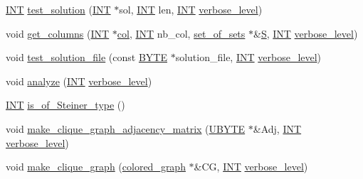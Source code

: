 \begin{DoxyCompactItemize}
\item 
\mbox{\hyperlink{galois_8h_a09fddde158a3a20bd2dcadb609de11dc}{I\+NT}} \mbox{\hyperlink{classdiophant_a385461230652130d1e4587cd99211462}{test\+\_\+solution}} (\mbox{\hyperlink{galois_8h_a09fddde158a3a20bd2dcadb609de11dc}{I\+NT}} $\ast$sol, \mbox{\hyperlink{galois_8h_a09fddde158a3a20bd2dcadb609de11dc}{I\+NT}} len, \mbox{\hyperlink{galois_8h_a09fddde158a3a20bd2dcadb609de11dc}{I\+NT}} \mbox{\hyperlink{simeon_8_c_a818073fbcc2f439e7c56952f67386122}{verbose\+\_\+level}})
\item 
void \mbox{\hyperlink{classdiophant_a394c08d30cf6df92f3d79ef52d0cff08}{get\+\_\+columns}} (\mbox{\hyperlink{galois_8h_a09fddde158a3a20bd2dcadb609de11dc}{I\+NT}} $\ast$\mbox{\hyperlink{k__arc__lifting_8_c_a567706515ba719f4d268271745d197e3}{col}}, \mbox{\hyperlink{galois_8h_a09fddde158a3a20bd2dcadb609de11dc}{I\+NT}} nb\+\_\+col, \mbox{\hyperlink{classset__of__sets}{set\+\_\+of\+\_\+sets}} $\ast$\&\mbox{\hyperlink{simeon_8_c_adab47f8243f1b5a2c31df2535d6b37d0}{S}}, \mbox{\hyperlink{galois_8h_a09fddde158a3a20bd2dcadb609de11dc}{I\+NT}} \mbox{\hyperlink{simeon_8_c_a818073fbcc2f439e7c56952f67386122}{verbose\+\_\+level}})
\item 
void \mbox{\hyperlink{classdiophant_ad5b890dbe56e93b6e7f2759d7d8ba35f}{test\+\_\+solution\+\_\+file}} (const \mbox{\hyperlink{galois_8h_ab6cc7b4aeb6ea31aba2b3fbfc83ff5e6}{B\+Y\+TE}} $\ast$solution\+\_\+file, \mbox{\hyperlink{galois_8h_a09fddde158a3a20bd2dcadb609de11dc}{I\+NT}} \mbox{\hyperlink{simeon_8_c_a818073fbcc2f439e7c56952f67386122}{verbose\+\_\+level}})
\item 
void \mbox{\hyperlink{classdiophant_a6548badaecf72d3ecb9989e9a3e518f0}{analyze}} (\mbox{\hyperlink{galois_8h_a09fddde158a3a20bd2dcadb609de11dc}{I\+NT}} \mbox{\hyperlink{simeon_8_c_a818073fbcc2f439e7c56952f67386122}{verbose\+\_\+level}})
\item 
\mbox{\hyperlink{galois_8h_a09fddde158a3a20bd2dcadb609de11dc}{I\+NT}} \mbox{\hyperlink{classdiophant_a4363b76a603ecbd649fe116a6c11e27f}{is\+\_\+of\+\_\+\+Steiner\+\_\+type}} ()
\item 
void \mbox{\hyperlink{classdiophant_ae55932f30e8a1d1809123a6e1dda24e8}{make\+\_\+clique\+\_\+graph\+\_\+adjacency\+\_\+matrix}} (\mbox{\hyperlink{galois_8h_a122c4acf389c050379f00341fdcd5812}{U\+B\+Y\+TE}} $\ast$\&Adj, \mbox{\hyperlink{galois_8h_a09fddde158a3a20bd2dcadb609de11dc}{I\+NT}} \mbox{\hyperlink{simeon_8_c_a818073fbcc2f439e7c56952f67386122}{verbose\+\_\+level}})
\item 
void \mbox{\hyperlink{classdiophant_a09b75f31505294ebafb566e07bd23cdd}{make\+\_\+clique\+\_\+graph}} (\mbox{\hyperlink{classcolored__graph}{colored\+\_\+graph}} $\ast$\&CG, \mbox{\hyperlink{galois_8h_a09fddde158a3a20bd2dcadb609de11dc}{I\+NT}} \mbox{\hyperlink{simeon_8_c_a818073fbcc2f439e7c56952f67386122}{verbose\+\_\+level}})

\end{DoxyCompactItemize}
